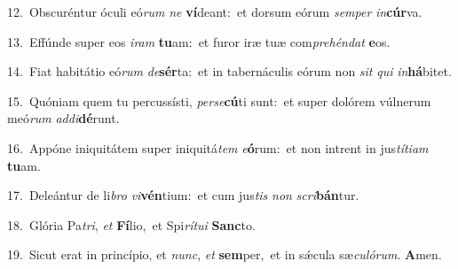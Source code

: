 {\numbfont\textcolor{\numbcolor}{12.}}~Obscuréntur óculi eó\textit{rum} \textit{ne} \textbf{ví}\-deant:~\star et dorsum eórum \textit{sem}\-\textit{per} \textit{in}\-\textbf{cúr}va.\par
{\numbfont\textcolor{\numbcolor}{13.}}~Effúnde super eos \textit{i}\-\textit{ram} \textbf{tu}\-am:~\star et furor iræ tuæ com\-\textit{pre}\-\textit{hén}\textit{dat} \textbf{e}\-os.\par
{\numbfont\textcolor{\numbcolor}{14.}}~Fiat habitátio eó\textit{rum} \textit{de}\-\textbf{sér}ta:~\star et in tabernáculis eórum non \textit{sit} \textit{qui} \textit{in}\-\textbf{há}bitet.\par
{\numbfont\textcolor{\numbcolor}{15.}}~Quóniam quem tu percussísti, \textit{per}\-\textit{se}\textbf{cú}ti sunt:~\star et super dolórem vúlnerum meó\textit{rum} \textit{ad}\-\textit{di}\textbf{dé}runt.\par
{\numbfont\textcolor{\numbcolor}{16.}}~Appóne iniquitátem super iniquitá\textit{tem} \textit{e}\-\textbf{ó}rum:~\star et non intrent in jus\-\textit{tí}\-\textit{ti}\textit{am} \textbf{tu}\-am.\par
{\numbfont\textcolor{\numbcolor}{17.}}~Deleántur de li\textit{bro} \textit{vi}\-\textbf{vén}tium:~\star et cum jus\textit{tis} \textit{non} \textit{scri}\-\textbf{bán}tur.\par
{\numbfont\textcolor{\numbcolor}{18.}}~Glória Pa\-\textit{tri}\-, \textit{et} \textbf{Fí}\-lio,~\star et Spi\-\textit{rí}\-\textit{tu}\textit{i} \textbf{Sanc}\-to.\par
{\numbfont\textcolor{\numbcolor}{19.}}~Sicut erat in princípio, et \textit{nunc}\-, \textit{et} \textbf{sem}\-per,~\star et in sǽcula sæ\-\textit{cu}\-\textit{ló}\textit{rum}. \textbf{A}\-men.\par
